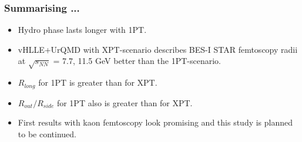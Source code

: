 \documentclass[dvipsnames] {beamer}
\begin{document}
      \begin{frame}
        \bf
        \frametitle{\bf \centering Summarising ...}
        \begin{itemize}
        \item Hydro phase lasts longer with 1PT.  
        \item vHLLE+UrQMD with XPT-scenario describes BES-I STAR femtoscopy radii at $\sqrt{s_{NN}}$ = 7.7, 11.5 GeV  better than the 1PT-scenario. 
        \item $R_{long}$ for 1PT is greater than for XPT.%
        \item $R_{out} / R_{side}$ for 1PT also is greater than for XPT.%
        \item First results with kaon femtoscopy look promising and this study is planned to be continued.
        \end{itemize}
      \end{frame}
\end{document}
